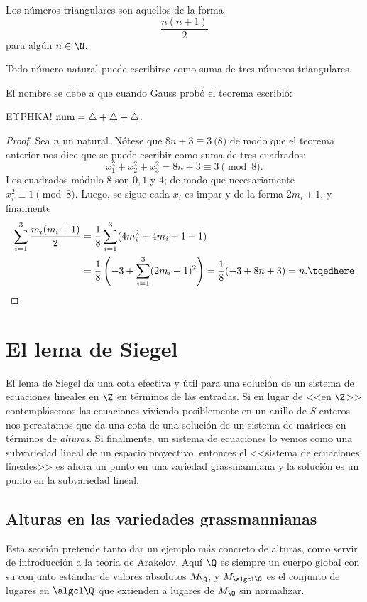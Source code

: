 \documentclass[teoria-numeros.tex]{subfiles}
\begin{document}
\begin{mydef}
	Los números triangulares son aquellos de la forma
	$$ \frac{n(n+1)}{2} $$
	para algún $n \in \N$.
\end{mydef}
\begin{thm}[Eureka]\label{thm:three_triangles}
	Todo número natural puede escribirse como suma de tres números triangulares.
\end{thm}
El nombre se debe a que cuando Gauss probó el teorema escribió:
\begin{center}
	\textgreek{ΕΥΡΗΚΑ!} \quad $\rm num = \triangle + \triangle + \triangle$.
\end{center}
\begin{proof}
	Sea $n$ un natural.
	Nótese que $8n + 3 \equiv 3 \pod 8$ de modo que el teorema anterior nos dice que se puede escribir como suma de tres cuadrados:
	$$ x_1^2 + x_2^2 + x_3^2 = 8n + 3 \equiv 3 \pmod 8. $$
	Los cuadrados módulo 8 son $0, 1$ y $4$; de modo que necesariamente $x_i^2 \equiv 1 \pmod 8$.
	Luego, se sigue cada $x_i$ es impar y de la forma $2m_i + 1$, y finalmente
	\begin{align}
		\sum_{i=1}^{3} \frac{m_i(m_i + 1)}{2} &= \frac{1}{8} \sum_{i=1}^{3} (4m_i^2 + 4m_i + 1 - 1) \notag \\
						      &= \frac{1}{8} \left( -3 + \sum_{i=1}^{3} (2m_i + 1)^2 \right) = \frac{1}{8}(-3 + 8n + 3) = n.
						      \tqedhere
	\end{align}
\end{proof}

\section{El lema de Siegel}
El lema de Siegel da una cota efectiva y útil para una solución de un sistema de ecuaciones lineales en $\Z$ en términos de las entradas.
Si en lugar de <<en $\Z$>> contemplásemos las ecuaciones viviendo posiblemente en un anillo de $S$-enteros nos percatamos que da una cota
de una solución de un sistema de matrices en términos de \textit{alturas}.
Si finalmente, un sistema de ecuaciones lo vemos como una subvariedad lineal de un espacio proyectivo, entonces el <<sistema de ecuaciones lineales>>
es ahora un punto en una variedad grassmanniana y la solución es un punto en la subvariedad lineal.

\subsection{Alturas en las variedades grassmannianas}
Esta sección pretende tanto dar un ejemplo más concreto de alturas, como servir de introducción a la teoría de Arakelov.
Aquí $\Q$ es siempre un cuerpo global con su conjunto estándar de valores absolutos $M_\Q$,
y $M_{\algcl\Q}$ es el conjunto de lugares en $\algcl\Q$ que extienden a lugares de $M_\Q$ sin normalizar.
\end{document}
